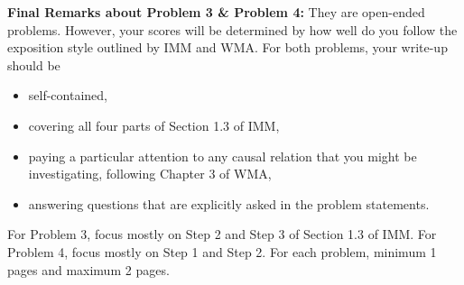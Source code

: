 \documentclass[12pt]{article}
\begin{document}
\vskip0.25in
\noindent\textbf{Final Remarks about Problem 3 \& Problem 4:} 
They are open-ended problems.  However, your scores will be determined
by how well do you follow the exposition style outlined by IMM and
WMA.  For both problems, your write-up should be 
\begin{itemize}
\item self-contained,
\item covering all four parts of Section 1.3 of IMM,
\item paying a particular attention to any causal relation that you
  might be investigating, following Chapter 3 of WMA,
\item answering questions that are explicitly asked in the problem statements.
\end{itemize}
For Problem 3, focus mostly on Step 2 and Step 3 of Section
1.3 of IMM.  For Problem 4, focus mostly on Step 1 and Step
2.  For each problem, minimum 1 pages and maximum 2 pages.
\end{document}
